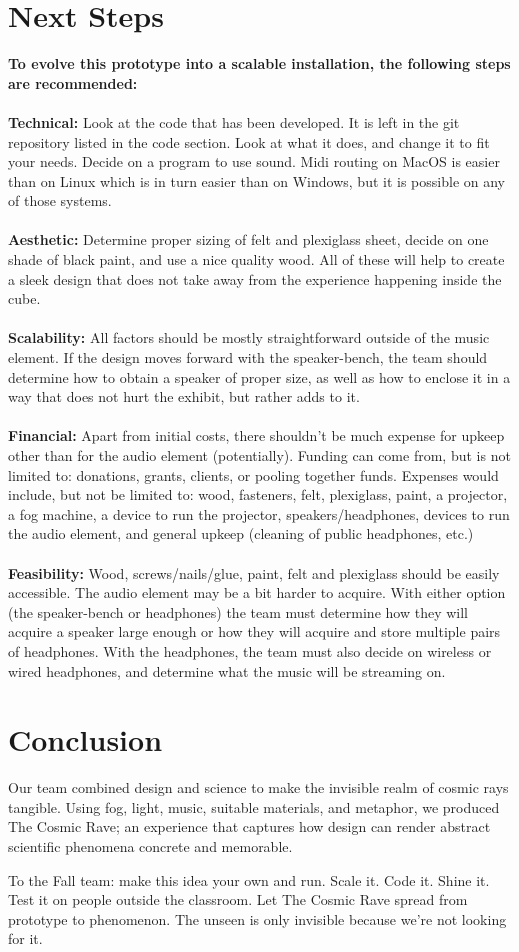\documentclass{article}
\begin{document}
\section{Next Steps}
\textbf{To evolve this prototype into a scalable installation, the following steps are recommended:
}
\\\\
\textbf{Technical:} Look at the code that has been developed. It is left in the git repository listed in the code section. Look at what it does, and change it to fit your needs. Decide on a program to use sound. Midi routing on MacOS is easier than on Linux which is in turn easier than on Windows, but it is possible on any of those systems. 
\\\\
\textbf{Aesthetic:} Determine proper sizing of felt and plexiglass sheet, decide on one shade of black paint, and use a nice quality wood. All of these will help to create a sleek design that does not take away from the experience happening inside the cube. 
\\\\
\textbf{Scalability:} All factors should be mostly straightforward outside of the music element. If the design moves forward with the speaker-bench, the team should determine how to obtain a speaker of proper size, as well as how to enclose it in a way that does not hurt the exhibit, but rather adds to it. 
\\\\
\textbf{Financial:} Apart from initial costs, there shouldn’t be much expense for upkeep other than for the audio element (potentially). Funding can come from, but is not limited to: donations, grants, clients, or pooling together funds. Expenses would include, but not be limited to: wood, fasteners, felt, plexiglass, paint, a projector, a fog machine, a device to run the projector, speakers/headphones, devices to run the audio element, and general upkeep (cleaning of public headphones, etc.)
\\\\	  
\textbf{Feasibility:} Wood, screws/nails/glue, paint, felt and plexiglass should be easily accessible. The audio element may be a bit harder to acquire. With either option (the speaker-bench or headphones) the team must determine how they will acquire a speaker large enough or how they will acquire and store multiple pairs of headphones. With the headphones, the team must also decide on wireless or wired headphones, and determine what the music will be streaming on.

\section{Conclusion}
Our team combined design and science to make the invisible realm of cosmic rays tangible. Using fog, light, music, suitable materials, and metaphor, we produced The Cosmic Rave; an experience that captures how design can render abstract scientific phenomena concrete and memorable. 

To the Fall team: make this idea your own and run. Scale it. Code it. Shine it. Test it on people outside the classroom. Let The Cosmic Rave spread from prototype to phenomenon. The unseen is only invisible because we're not looking for it.
\end{document}
